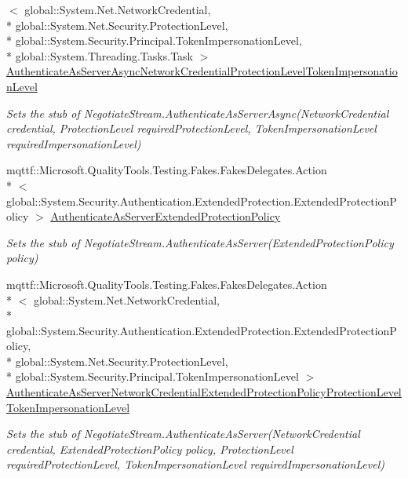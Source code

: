 \begin{DoxyCompactItemize}
$<$ global\-::\-System.\-Net.\-Network\-Credential, \\*
global\-::\-System.\-Net.\-Security.\-Protection\-Level, \\*
global\-::\-System.\-Security.\-Principal.\-Token\-Impersonation\-Level, \\*
global\-::\-System.\-Threading.\-Tasks.\-Task $>$ \hyperlink{class_system_1_1_net_1_1_security_1_1_fakes_1_1_stub_negotiate_stream_aa87ac74a9dce315c04d238fa1fbb4daa}{Authenticate\-As\-Server\-Async\-Network\-Credential\-Protection\-Level\-Token\-Impersonation\-Level}
\begin{DoxyCompactList}\small\item\em Sets the stub of Negotiate\-Stream.\-Authenticate\-As\-Server\-Async(\-Network\-Credential credential, Protection\-Level required\-Protection\-Level, Token\-Impersonation\-Level required\-Impersonation\-Level)\end{DoxyCompactList}\item 
mqttf\-::\-Microsoft.\-Quality\-Tools.\-Testing.\-Fakes.\-Fakes\-Delegates.\-Action\\*
$<$ global\-::\-System.\-Security.\-Authentication.\-Extended\-Protection.\-Extended\-Protection\-Policy $>$ \hyperlink{class_system_1_1_net_1_1_security_1_1_fakes_1_1_stub_negotiate_stream_a116a325257f3bc6f3f1ba91d0395e75b}{Authenticate\-As\-Server\-Extended\-Protection\-Policy}
\begin{DoxyCompactList}\small\item\em Sets the stub of Negotiate\-Stream.\-Authenticate\-As\-Server(\-Extended\-Protection\-Policy policy)\end{DoxyCompactList}\item 
mqttf\-::\-Microsoft.\-Quality\-Tools.\-Testing.\-Fakes.\-Fakes\-Delegates.\-Action\\*
$<$ global\-::\-System.\-Net.\-Network\-Credential, \\*
global\-::\-System.\-Security.\-Authentication.\-Extended\-Protection.\-Extended\-Protection\-Policy, \\*
global\-::\-System.\-Net.\-Security.\-Protection\-Level, \\*
global\-::\-System.\-Security.\-Principal.\-Token\-Impersonation\-Level $>$ \hyperlink{class_system_1_1_net_1_1_security_1_1_fakes_1_1_stub_negotiate_stream_af29c520aa8a303f3a676911812932bcd}{Authenticate\-As\-Server\-Network\-Credential\-Extended\-Protection\-Policy\-Protection\-Level\-Token\-Impersonation\-Level}
\begin{DoxyCompactList}\small\item\em Sets the stub of Negotiate\-Stream.\-Authenticate\-As\-Server(\-Network\-Credential credential, Extended\-Protection\-Policy policy, Protection\-Level required\-Protection\-Level, Token\-Impersonation\-Level required\-Impersonation\-Level)\end{DoxyCompactList}\item 

\end{DoxyCompactItemize}
